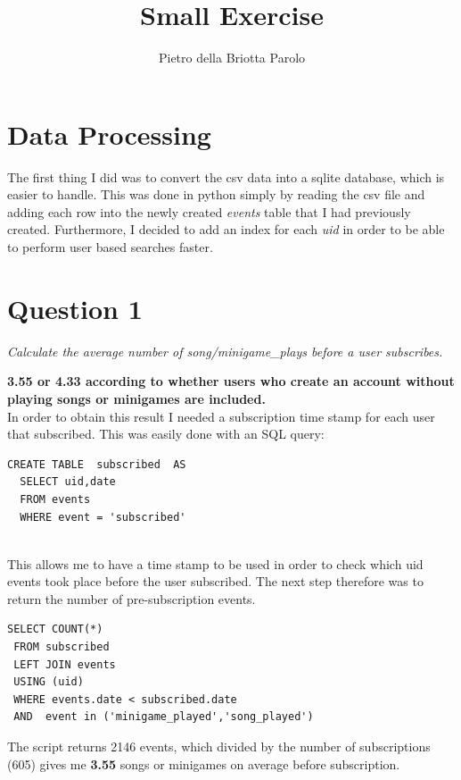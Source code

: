 \documentclass[paper=a4, fontsize=10pt]{report}
\title{Small Exercise}
\author{Pietro della Briotta Parolo}
\date{}
\begin{document}
\maketitle
\section*{Data Processing}

The first thing I did was to convert the csv data into a sqlite database, which is easier to handle. This was done in python
simply by reading the csv file and adding each row into the newly created \textit{events} table that I had previously created. Furthermore,
I decided to add an index for each \textit{uid} in order to be able to perform user based searches faster.

\section*{Question 1}

\textit{ Calculate the average number of song/minigame\_plays before a user subscribes.}

\textbf{3.55 or 4.33 according to whether users who create an account without playing songs or minigames are included.}\\

In order to obtain this result I needed a subscription time stamp for each user that subscribed. This was easily done with an SQL query:


\footnotesize
\begin{lstlisting}[frame=single,caption=Generate subscription table \label{code:sub_table}]
  CREATE TABLE  subscribed  AS
  SELECT uid,date
  FROM events
  WHERE event = 'subscribed'
        
\end{lstlisting} 
\normalsize

This allows me to have a time stamp to be used in order to check which uid events took place before the user subscribed. The next step therefore was to return the number of pre-subscription events.

\footnotesize
\begin{lstlisting}[frame=single,caption=Return pre-sub events \label{code:pre_sub_table}]
 SELECT COUNT(*) 
 FROM subscribed 
 LEFT JOIN events
 USING (uid)
 WHERE events.date < subscribed.date
 AND  event in ('minigame_played','song_played')
\end{lstlisting}
\normalsize

The script returns 2146 events, which divided by the number of subscriptions (605) gives me
\textbf{3.55} songs or minigames on average before subscription.
\end{document}
